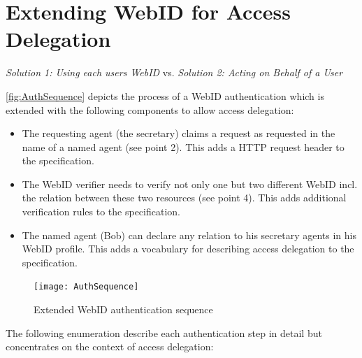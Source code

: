 \documentclass[a4paper]{llncs}
\begin{document}

\section{Extending WebID for Access Delegation}\label{sec:spec}

\textit{Solution 1: Using each users WebID} vs.
\textit{Solution 2: Acting on Behalf of a User}


\autoref{fig:AuthSequence} depicts the process of a WebID authentication which is extended with the following components to allow access delegation:

\begin{itemize}
    \item The requesting agent (the secretary) claims a request as requested in the name of a named agent (see point 2).
        This adds a HTTP request header to the specification.
    \item The WebID verifier needs to verify not only one but two different WebID incl. the relation between these two resources (see point 4).
        This adds additional verification rules to the specification.
    \item The named agent (Bob) can declare any relation to his secretary agents in his WebID profile.
        This adds a vocabulary for describing access delegation to the specification.
\end{itemize}

\begin{figure}[htb]
  \centering
  \texttt{[image: AuthSequence]}
  \caption{Extended WebID authentication sequence}
  \label{fig:AuthSequence}
\end{figure}

The following enumeration describe each authentication step in detail but concentrates on the context of access delegation:
\end{document}
